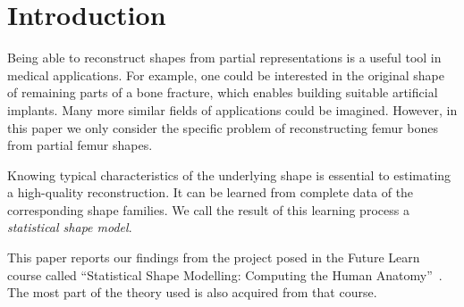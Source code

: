 \section{Introduction}
\label{sec:intro}


Being able to reconstruct shapes from partial representations is a useful tool in medical applications.
For example, one could be interested in the original shape of remaining parts of a bone fracture, which enables building suitable artificial implants.
Many more similar fields of applications could be imagined.
However, in this paper we only consider the specific problem of reconstructing femur bones from partial femur shapes.

Knowing typical characteristics of the underlying shape is essential to estimating a high-quality reconstruction.
It can be learned from complete data of the corresponding shape families.
We call the result of this learning process a \emph{statistical shape model}.

This paper reports our findings from the project posed in the Future Learn course called ``Statistical Shape Modelling: Computing the Human Anatomy''~\cite{mooc2019statistical}.
The most part of the theory used is also acquired from that course.
